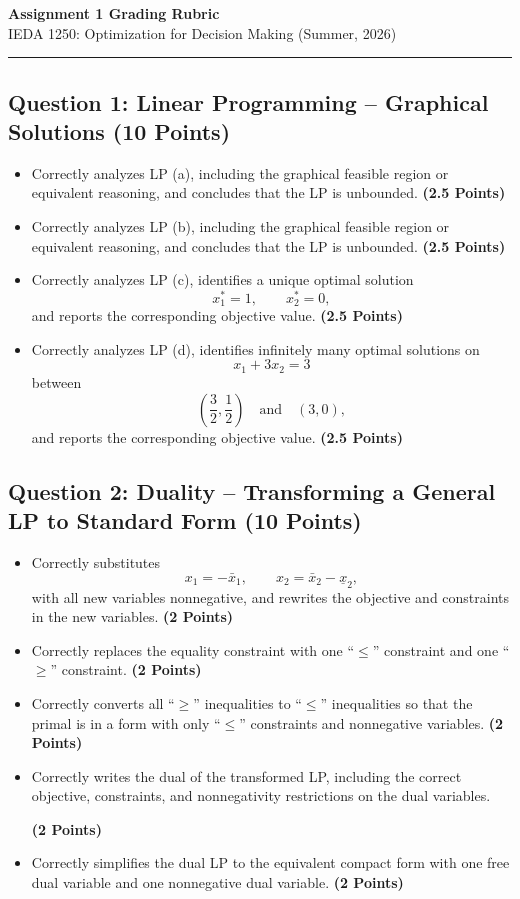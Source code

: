 \documentclass[11pt, letterpaper]{article}
\newcommand{\question}[2]{
    \subsection*{Question #1: #2}
}
\newcommand{\points}[1]{
    \textbf{(#1 Points)}
}
\begin{document}
\begin{center}
    {\Huge \textbf{Assignment 1 Grading Rubric}} \\
    \vspace{0.2cm}
    {\large IEDA 1250: Optimization for Decision Making (Summer, 2026)} \\
    \vspace{0.5cm}
    \hrule
\end{center}

\question{1}{Linear Programming -- Graphical Solutions \points{10}}

\begin{itemize}
    \item Correctly analyzes LP (a), including the graphical feasible region or
    equivalent reasoning, and concludes that the LP is unbounded. \points{2.5}

    \item Correctly analyzes LP (b), including the graphical feasible region or
    equivalent reasoning, and concludes that the LP is unbounded. \points{2.5}

    \item Correctly analyzes LP (c), identifies a unique optimal solution
    \[
    x_1^*=1,\qquad x_2^*=0,
    \]
    and reports the corresponding objective value. \points{2.5}

    \item Correctly analyzes LP (d), identifies infinitely many optimal solutions on
    \[
    x_1+3x_2=3
    \]
    between
    \[
    \left(\frac{3}{2},\frac{1}{2}\right)
    \quad \text{and} \quad
    (3,0),
    \]
    and reports the corresponding objective value. \points{2.5}
\end{itemize}


\question{2}{Duality -- Transforming a General LP to Standard Form \points{10}}

\begin{itemize}
    \item Correctly substitutes
    \[
    x_1=-\bar{x}_1,\qquad x_2=\bar{x}_2-\underline{x}_2,
    \]
    with all new variables nonnegative, and rewrites the objective and constraints
    in the new variables. \points{2}

    \item Correctly replaces the equality constraint with one ``$\leq$'' constraint
    and one ``$\geq$'' constraint. \points{2}

    \item Correctly converts all ``$\geq$'' inequalities to ``$\leq$'' inequalities
    so that the primal is in a form with only ``$\leq$'' constraints and
    nonnegative variables. \points{2}

    \item Correctly writes the dual of the transformed LP, including the correct
    objective, constraints, and nonnegativity restrictions on the dual variables.
    \points{2}

    \item Correctly simplifies the dual LP to the equivalent compact form with one
    free dual variable and one nonnegative dual variable. \points{2}
\end{itemize}
\end{document}
